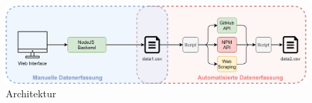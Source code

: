 \begin{figure}[]
    \centering
    \includegraphics[scale=0.1]{figures/04/DatenerfassungArchitektur.png}
    \caption{Architektur}
    \label{abb:Architektur}
\end{figure}




